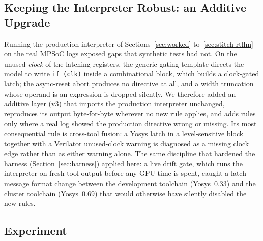 \documentclass[11pt]{article}
\begin{document}
\subsection{Keeping the Interpreter Robust: an Additive Upgrade}
\label{sec:mpsoc-v3}

Running the production interpreter of Sections~\ref{sec:worked}
to~\ref{sec:stitch-rtllm} on the real MPSoC logs exposed gaps that synthetic
tests had not. On the unused \emph{clock} of the latching registers, the
generic gating template directs the model to write \texttt{if (clk)} inside a
combinational block, which builds a clock-gated latch; the async-reset abort
produces no directive at all, and a width truncation whose operand is an
expression is dropped silently. We therefore added an additive layer (v3) that
imports the production interpreter unchanged, reproduces its output
byte-for-byte wherever no new rule applies, and adds rules only where a real
log showed the production directive wrong or missing. Its most consequential
rule is cross-tool fusion: a Yosys latch in a level-sensitive block together
with a Verilator unused-clock warning is diagnosed as a missing clock edge
rather than as either warning alone. The same discipline that hardened the
harness (Section~\ref{sec:harness}) applied here: a live drift gate, which runs
the interpreter on fresh tool output before any GPU time is spent, caught a
latch-message format change between the development toolchain (Yosys~$0.33$)
and the cluster toolchain (Yosys~$0.69$) that would otherwise have silently
disabled the new rules.

\subsection{Experiment}
\label{sec:mpsoc-exp}
\end{document}
